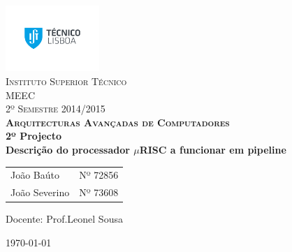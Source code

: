 \begin{titlepage}
	
	\begin{center}
		
		\includegraphics[trim = 4cm 4cm 4cm 4cm, keepaspectratio=true, height=2.5cm]{./images/IST_LOGO.pdf}~\\[0.5cm]
		
		\textsc{\LARGE Instituto Superior Técnico\\[0.5cm]
		               MEEC\\[0.5cm]
		               2º Semestre 2014/2015\\[2cm]
		               \huge \bfseries Arquitecturas Avançadas de Computadores}\\[1cm]
		
		\huge \bfseries 2º Projecto \\[1cm]
		\huge \bfseries Descrição do processador $\mu$RISC a funcionar em
		pipeline
		\\[0.5cm]
		\vfill
		\large
\begin{tabular}{l r}
João Baúto &  Nº 72856\\
João Severino & Nº 73608\\
\end{tabular}

		\vfill
		\begin{center}
		Docente: Prof.Leonel Sousa
		\end{center}
		\vfill
		{\large \today}

	\end{center}
	
	\cleardoublepage
	\setcounter{page}{1}
\end{titlepage}
